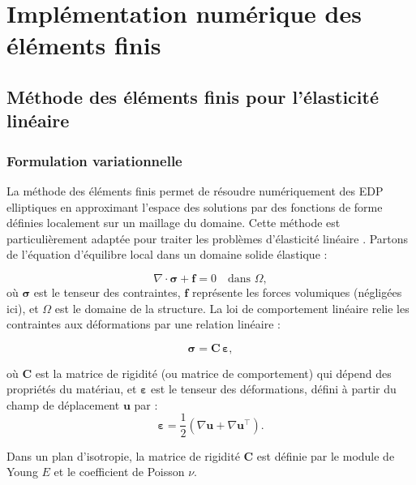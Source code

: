 \documentclass[a4paper,11pt]{article}
\begin{document}
\section{Implémentation numérique des éléments finis}

\subsection{Méthode des éléments finis pour l'élasticité linéaire}

\subsubsection*{Formulation variationnelle}
La méthode des éléments finis permet de résoudre numériquement des EDP elliptiques en approximant l'espace des solutions par des fonctions de forme définies localement sur un maillage du domaine. Cette méthode est particulièrement adaptée pour traiter les problèmes d'élasticité linéaire \cite{ZienkiewiczFEM}. Partons de l'équation d'équilibre local dans un domaine solide élastique :

\begin{equation}
\nabla \cdot \boldsymbol{\sigma} + \mathbf{f} = 0 \quad \text{dans } \Omega,
\end{equation}
où $\boldsymbol{\sigma}$ est le tenseur des contraintes, $\mathbf{f}$ représente les forces volumiques (négligées ici), et $\Omega$ est le domaine de la structure. La loi de comportement linéaire relie les contraintes aux déformations par une relation linéaire :

\begin{equation}
\boldsymbol{\sigma} = \mathbf{C}\,\boldsymbol{\varepsilon},
\end{equation}
 
où $\mathbf{C}$ est la matrice de rigidité (ou matrice de comportement) qui dépend des propriétés du matériau, et $\boldsymbol{\varepsilon}$ est le tenseur des déformations, défini à partir du champ de déplacement $\mathbf{u}$ par :
\begin{equation}
\boldsymbol{\varepsilon} = \frac{1}{2}(\nabla \mathbf{u} + \nabla \mathbf{u}^\top).
\end{equation}

Dans un plan d'isotropie, la matrice de rigidité $\mathbf{C}$ est définie par le module de Young $E$ et le coefficient de Poisson $\nu$. \\
\end{document}
